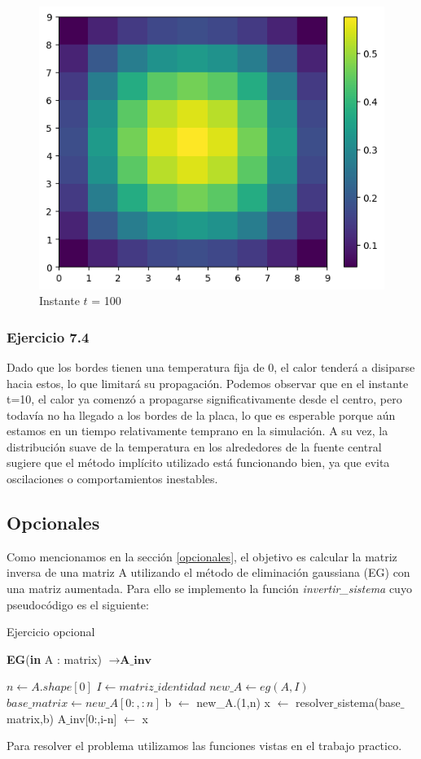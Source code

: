\begin{figure}[H]
\begin{minipage}[b]{0.5\linewidth}
  \end{minipage}%
  \begin{minipage}[b]{0.5\linewidth}
    \centering
    \includegraphics[width=.5\linewidth]{./img/instante100.png}
  \caption{Instante $t$ = 100}\label{instante100}
    \vspace{4ex}
  \end{minipage} 
\end{figure}

\subsubsection{Ejercicio 7.4}
Dado que los bordes tienen una temperatura fija de 0, el calor tenderá a disiparse hacia estos, lo que limitará su propagación.
Podemos observar que en el instante t=10, el calor ya comenzó a propagarse significativamente desde el centro, pero todavía no ha llegado a los bordes de la placa, lo que es esperable porque aún estamos en un tiempo relativamente temprano en la simulación. A su vez, la distribución suave de la temperatura en los alrededores de la fuente central sugiere que el método implícito utilizado está funcionando bien, ya que evita oscilaciones o comportamientos inestables.

 \subsection{Opcionales}

 Como mencionamos en la sección \ref{opcionales}, el objetivo es calcular la matriz inversa de una matriz A utilizando el método de eliminación gaussiana (EG) con una matriz aumentada. Para ello se implemento la función \textit{invertir\_sistema} cuyo pseudocódigo es el siguiente: 
 
\begin{algorithm}[H]
\caption{Ejercicio opcional}
\begin{algorithmic}
\State \textbf{EG}(\textbf{in} A : matrix) $\to \textbf{A\_inv}$
 
 \State $n \gets A.shape[0]$
 \State $I \gets matriz\_identidad$
 \State $new\_A \gets eg(A,I)$
 \State $base\_matrix \gets new\_A[0:,:n]$
        \State  b $\gets$ new\_A.(1,n)
        \State x $\gets$ resolver$\_$sistema(base$\_$matrix,b)
        \State A$\_$inv[0:,i-n] $\gets$ x
\EndFor
{}
\end{algorithmic}
\end{algorithm}

Para resolver el problema utilizamos las funciones vistas en el trabajo practico.